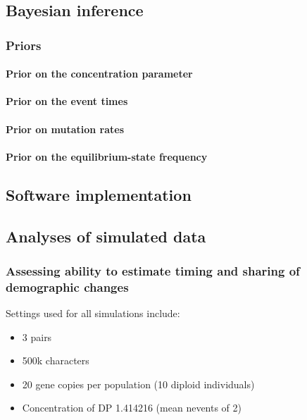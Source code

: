 \subsection{Bayesian inference}

\subsubsection{Priors}

\paragraph{Prior on the concentration parameter}

\paragraph{Prior on the event times}

\paragraph{Prior on mutation rates}

\paragraph{Prior on the equilibrium-state frequency}

\subsection{Software implementation}

\subsection{Analyses of simulated data}

\subsubsection{Assessing ability to estimate timing and sharing of demographic changes}

Settings used for all simulations include:
\begin{itemize}
    \item 3 pairs
    \item 500k characters
    \item 20 gene copies per population (10 diploid individuals)
    \item Concentration of DP 1.414216 (mean nevents of 2)
\end{itemize}

